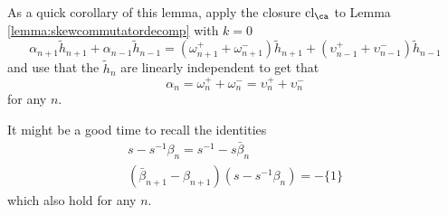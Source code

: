 \begin{remark}
As a quick corollary of this lemma, apply the closure $\textrm{cl}_\ca$ to Lemma \ref{lemma:skewcommutatordecomp} with $k=0$ 
\[
\alpha_{n+1} \tilde{h}_{n+1} + \alpha_{n-1} \tilde{h}_{n-1} = ( \omega^+_{n+1} + \omega^-_{n+1} ) \tilde{h}_{n+1} + ( \upsilon^+_{n-1} + \upsilon^-_{n-1} ) \tilde{h}_{n-1}
\]
and use that the $\tilde{h}_n$ are linearly independent to get that 
\[
\alpha_n = \omega_n^+ + \omega_n^- = \upsilon_n^+ + \upsilon_n^-
\]
for any $n$. 
\end{remark}
















It might be a good time to recall the identities
\begin{gather*}
s - s^{-1}\beta_n = s^{-1} - s\bar{\beta}_n \\
\left( \bar{\beta}_{n+1} - \beta_{n+1} \right) \left( s-s^{-1}\beta_n \right) = - \{1\}
\end{gather*}
which also hold for any $n$.

